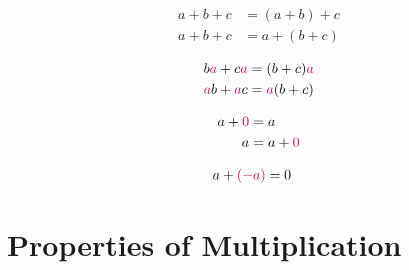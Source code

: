 \documentclass[20150903-160354-rs2.2-MarksMathNotebook.tex]{subfiles}
\begin{document}
\begin{definition}
\begin{subequations}
\begin{align}
a+b+c &= (a+b)+c \label{eq:apa1} \\
a+b+c &= a+(b+c) \label{eq:apa2}
\end{align}
\end{subequations}
\end{definition}

\begin{definition}
\begin{subequations}
\begin{align}
b\alert{a} + c\alert{a} &= (b+c)\alert{a} \label{eq:dpf1} \\
\alert{a}b + \alert{a}c &= \alert{a}(b+c) \label{eq:dpf2}
\end{align}
\end{subequations}
\end{definition}

\begin{definition}
\begin{subequations}
\begin{align}
a+\alert{0} &= a \label{eq:aid1} \\
a &= a+\alert{0} \label{eq:aid2}
\end{align}
\end{subequations}
\end{definition}

\begin{definition}
\begin{subequations}
\begin{align}
a + \alert{(-a)} &= 0 \label{eq:ai}
\end{align}
\end{subequations}
\end{definition}





\section{Properties of Multiplication}
\end{document}
